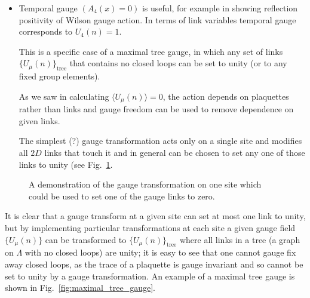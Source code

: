 \begin{itemize}
\begin{itemize}
\begin{align}
          &= \sum_\mu \partial_\mu A_\mu^a + \mathcal{O}(a)
      \end{align}
      Note that finding $\text{max}_\Omega L_U[\Omega]$ is a challenging optimization task over $(N^2 - 1)V$ degrees of freedom
      \item even finding a local maximum is computationally demanding - see Olivera \& Silva, Comp Phys Com 158 (2004)73 for discussion.
      \item since $\partial_\mu A^\mu = 0$ intersects the gauge orbit of a given gauge field multiple times (Gribov copies), there are multiple maxima of $L_U[\Omega]$.
      \item For gauge invariant quantities, the presence of Gribov copies (Gribov-Singer, Singer proved you cannot define a gauge fixing that avoids the ambiguity on $S^4$) does not matter as they are included in the integral defining expectation values and in $Z$. For gauge variant quantities, it is possible to define a subsidiary condition to choose a global maximum (e.g. minimizing $\int \text{d}x \operatorname{tr} [A_\mu(x)^2]$) but it isn't clear if this means the same as in the continuum.
      
  \end{itemize}
  \item Temporal gauge $(A_4(x) = 0)$ is useful, for example in showing reflection positivity of Wilson gauge action. In terms of link variables temporal gauge corresponds to $U_4(n) = 1$.

  This is a specific case of a maximal tree gauge, in which any set of links $\{ U_\mu(n)\}_{\text{tree}}$ that contains no closed loops can be set to unity (or to any fixed group elements).

  As we saw in calculating $\langle U_\mu(n) \rangle = 0$, the action depends on plaquettes rather than links and gauge freedom can be used to remove dependence on given links.

  The simplest (?) gauge transformation acts only on a single site and modifies all $2D$ links that touch it and in general can be chosen to set any one of those links to unity (see Fig.~\ref{fig:simplest_gauge_transformation}.
\end{itemize}
\begin{figure}
\caption{A demonstration of the gauge transformation on one site which could be used to set one of the gauge links to zero.
\label{fig:simplest_gauge_transformation}
}
\end{figure}
It is clear that a gauge transform at a given site can set at most one link to unity, but by implementing particular transformations at each site a given gauge field $\{ U_\mu(n)\}$ can be transformed to $\{ U_\mu (n)\}_\text{tree}$ where all links in a tree (a graph on $\Lambda$ with no closed loops) are unity; it is easy to see that one cannot gauge fix away closed loops, as the trace of a plaquette is gauge invariant and so cannot be set to unity by a gauge transformation. An example of a maximal tree gauge is shown in Fig.~\ref{fig:maximal_tree_gauge}.

